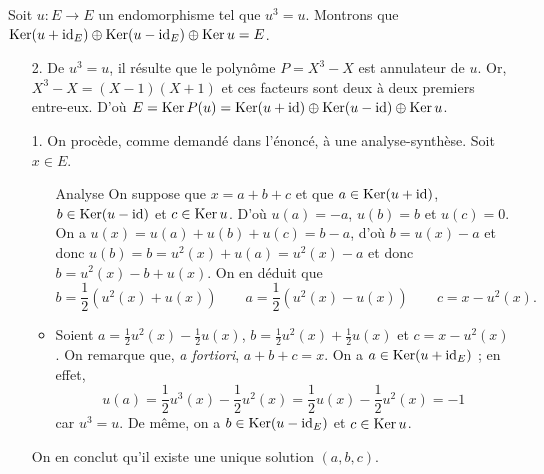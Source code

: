 \begin{exo}
	Soit $u : E \to E$\/ un endomorphisme tel que $u^3 = u$.
	Montrons que $\operatorname{Ker}(u+\operatorname{id}_E) \oplus \operatorname{Ker}(u - \operatorname{id}_E) \oplus \operatorname{Ker} u = E$.

	\begin{enumerate}
		\item[2.] De $u^3 = u$, il résulte que le polynôme $P = X^3 - X$\/ est annulateur de $u$. Or, $X^3 - X = (X - 1)(X+1)$\/ et ces facteurs sont deux à deux premiers entre-eux. D'où $E = \operatorname{Ker} P(u) = \operatorname{Ker}(u+\operatorname{id}) \oplus \operatorname{Ker}(u - \operatorname{id}) \oplus \operatorname{Ker} u$.
		\item[1.] On procède, comme demandé dans l'énoncé, à une analyse-synthèse. Soit $x \in E$.
			\begin{itemize}
				\item[{\sc Analyse}] On suppose que $x = a + b + c$\/ et que $a \in \operatorname{Ker}(u+\operatorname{id})$, $b \in \operatorname{Ker}(u-\operatorname{id})$\/ et $c \in \operatorname{Ker} u$.
					D'où $u(a) = -a$, $u(b) = b$\/ et $u(c) = 0$.
					On a $u(x) = u(a) + u(b) + u(c) = b - a$, d'où $b = u(x) - a$ et donc $u(b) =  b = u^2(x) + u(a) = u^2(x) -a$\/ et donc $b = u^2(x) - b + u(x)$. On en déduit que \[
						b = \frac{1}{2} \left( u^2(x) + u(x) \right)
						\qquad
						a = \frac{1}{2}\left( u^2(x) - u(x) \right)
						\qquad
						c = x - u^2(x).
					\]
				\item Soient $a = \frac{1}{2}u^2(x) - \frac{1}{2}u(x)$, $b = \frac{1}{2} u^2(x) + \frac{1}{2}u(x)$\/ et $c = x - u^2(x)$.
					On remarque que, {\it a fortiori}, $a + b + c = x$.
					On a $a \in \operatorname{Ker}(u + \operatorname{id}_E)$\/ ; en effet, \[
						u(a) = \frac{1}{2}u^3(x) - \frac{1}{2}u^2(x) = \frac{1}{2}u(x) - \frac{1}{2}u^2(x) = -1
					\] car $u^3 = u$.
					De même, on a $b \in \operatorname{Ker}(u - \operatorname{id}_E)$\/ et $c \in \operatorname{Ker} u$.
			\end{itemize}
			On en conclut qu'il existe une unique solution $(a,b,c)$.
	\end{enumerate}
\end{exo}
